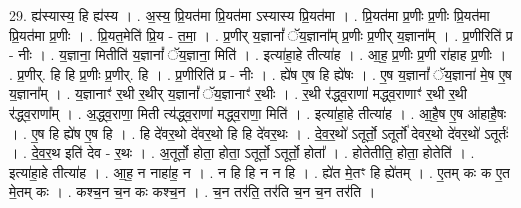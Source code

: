 \documentclass[17pt]{extarticle}
\begin{document}
29. ह्य॑स्यास्य॒ हि ह्य॑स्य । . अ॒स्य॒ प्रि॒यत॑मा प्रि॒यत॑मा ऽस्यास्य प्रि॒यत॑मा । . प्रि॒यत॑मा प्र॒णीः प्र॒णीः प्रि॒यत॑मा प्रि॒यत॑मा प्र॒णीः । . प्रि॒यत॒मेति॑ प्रि॒य - त॒मा॒ । . प्र॒णीर् य॒ज्ञानां᳚ ॅय॒ज्ञाना᳚म् प्र॒णीः प्र॒णीर् य॒ज्ञाना᳚म् । . प्र॒णीरिति॑ प्र - नीः । . य॒ज्ञाना॒ मितीति॑ य॒ज्ञानां᳚ ॅय॒ज्ञाना॒ मिति॑ । . इत्या॑हा॒हे तीत्या॑ह । . आ॒ह॒ प्र॒णीः प्र॒णी रा॑हाह प्र॒णीः । . प्र॒णीर्. हि हि प्र॒णीः प्र॒णीर्. हि । . प्र॒णीरिति॑ प्र - नीः । . ह्ये॑ष ए॒ष हि ह्ये॑षः । . ए॒ष य॒ज्ञानां᳚ ॅय॒ज्ञाना॑ मे॒ष ए॒ष य॒ज्ञाना᳚म् । . य॒ज्ञानाꣳ॑ र॒थी र॒थीर् य॒ज्ञानां᳚ ॅय॒ज्ञानाꣳ॑ र॒थीः । . र॒थी र॑द्ध्व॒राणा॑ मद्ध्व॒राणाꣳ॑ र॒थी र॒थी र॑द्ध्व॒राणा᳚म् । . अ॒द्ध्व॒राणा॒ मिती त्य॑द्ध्व॒राणा॑ मद्ध्व॒राणा॒ मिति॑ । . इत्या॑हा॒हे तीत्या॑ह । . आ॒है॒ष ए॒ष आ॑हाहै॒षः । . ए॒ष हि ह्ये॑ष ए॒ष हि । . हि दे॑वर॒थो दे॑वर॒थो हि हि दे॑वर॒थः । . दे॒व॒र॒थो॑ ऽतूर्तो॒ ऽतूर्तो॑ देवर॒थो दे॑वर॒थो॑ ऽतूर्तः॑ । . दे॒व॒र॒थ इति॑ देव - र॒थः । . अ॒तूर्तो॒ होता॒ होता॒ ऽतूर्तो॒ ऽतूर्तो॒ होता᳚ । . होतेतीति॒ होता॒ होतेति॑ । . इत्या॑हा॒हे तीत्या॑ह । . आ॒ह॒ न नाहा॑ह॒ न । . न हि हि न न हि । . ह्ये॑त मे॒तꣳ हि ह्ये॑तम् । . ए॒तम् कः क ए॒त मे॒तम् कः । . कश्च॒न च॒न कः कश्च॒न । . च॒न तर॑ति॒ तर॑ति च॒न च॒न तर॑ति । \newline
\end{document}
